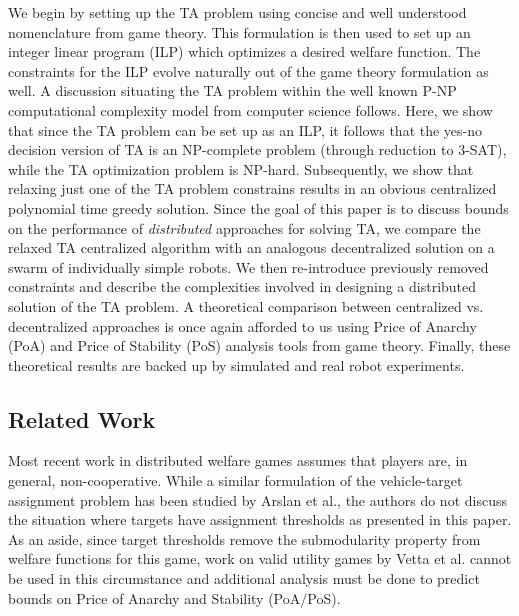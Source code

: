\documentclass[11pt, onecolumn, compsoc, letterpaper]{article}
\begin{document}
We begin by setting up the TA problem using concise and well understood nomenclature from game theory. This formulation is then used to set up an integer linear program (ILP) which optimizes a desired welfare function. The constraints for the ILP evolve naturally out of the game theory formulation as well. A discussion situating the TA problem within the well known P-NP computational complexity model from computer science follows. Here, we show that since the TA problem can be set up as an ILP, it follows that the yes-no decision version of TA is an NP-complete problem (through reduction to 3-SAT), while the TA optimization problem is NP-hard. Subsequently, we show that relaxing just one of the TA problem constrains results in an obvious centralized polynomial time greedy solution. Since the goal of this paper is to discuss bounds on the performance of \emph{distributed} approaches for solving TA, we compare the relaxed TA centralized algorithm with an analogous decentralized solution on a swarm of individually simple robots. We then re-introduce previously removed constraints and describe the complexities involved in designing a distributed solution of the TA problem. A theoretical comparison between centralized vs. decentralized approaches is once again afforded to us using Price of Anarchy (PoA) and Price of Stability (PoS) analysis tools from game theory. Finally, these theoretical results are backed up by simulated and real robot experiments.


\subsection{Related Work}
Most recent work in distributed welfare games\cite{Marden2008, Marden2013} assumes that players are, in general, non-cooperative. While a similar formulation of the vehicle-target assignment problem has been studied by Arslan et al.\cite{Arslan2007}, the authors do not discuss the situation where targets have assignment thresholds as presented in this paper. As an aside, since target thresholds remove the submodularity property from welfare functions for this game, work on valid utility games by Vetta et al.\cite{Vetta2002} cannot be used in this circumstance and additional analysis must be done to predict bounds on Price of Anarchy and Stability (PoA/PoS).


\end{document}
